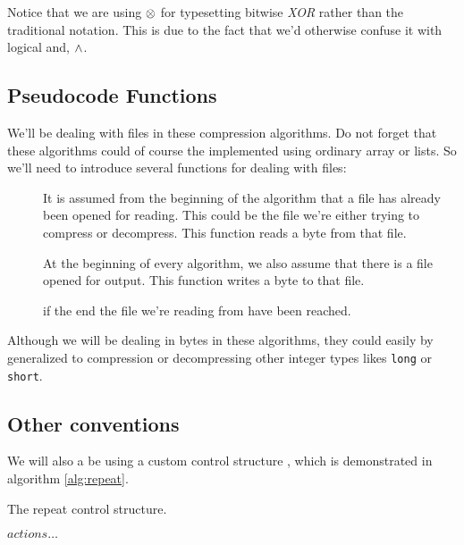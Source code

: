 \begin{refsection}
Notice that we are using $\mathrel{\otimes}$ for typesetting bitwise
\textit{XOR} rather than the traditional \C{} notation. This is due to
the fact that we'd otherwise confuse it with logical and, $\wedge$.

\subsection{Pseudocode Functions}
\label{sec:pseudocode}

We'll be dealing with files in these compression algorithms. Do not
forget that these algorithms could of course the implemented  using
ordinary array or lists. So we'll need to introduce several functions
for dealing with files:

\begin{description}
\item[] It is assumed from the beginning of the
  algorithm that a file has already been opened for reading. This
  could be the file we're either trying to compress or
  decompress. This function reads a byte from that file.

\item[] At the beginning of every algorithm, we also
  assume that there is a file opened for output. This function writes
  a byte to that file.

\item[] \True{} if the end the file we're
  reading from have been reached.

\end{description}

Although we will be dealing in bytes in these algorithms, they could
easily by generalized to compression or decompressing other integer
types likes \texttt{long} or \texttt{short}.

\subsection{Other conventions}
\label{sec:other-conventions}

We will also a be using a custom control structure \algorithmicrepeat,
which is demonstrated in algorithm \ref{alg:repeat}.

\begin{algorithm}[h]
  \caption{The repeat control structure.}
  \label{alg:repeat}
  \begin{algorithmic}[1]
      \State $actions\ldots$  %
    \EndRepeat
  \end{algorithmic}
\end{algorithm}


\end{refsection}
